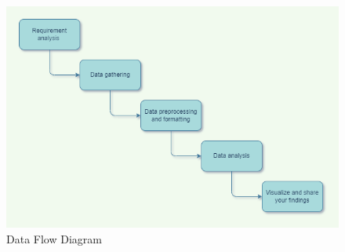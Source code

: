 \label{sec:data-flow}
\begin{figure}
	\centering
	\includegraphics[width=1.2\linewidth]{images/DFD.drawio.png}
	\caption{Data Flow Diagram}
\end{figure} 